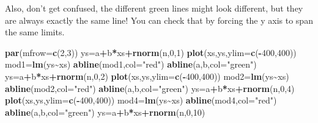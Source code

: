 \documentclass[
]{book}
\newenvironment{Shaded}{\begin{snugshade}}{\end{snugshade}}
\newcommand{\AttributeTok}[1]{\textcolor[rgb]{0.13,0.29,0.53}{#1}}
\newcommand{\DecValTok}[1]{\textcolor[rgb]{0.00,0.00,0.81}{#1}}
\newcommand{\FunctionTok}[1]{\textcolor[rgb]{0.13,0.29,0.53}{\textbf{#1}}}
\newcommand{\NormalTok}[1]{#1}
\newcommand{\OtherTok}[1]{\textcolor[rgb]{0.56,0.35,0.01}{#1}}
\newcommand{\SpecialCharTok}[1]{\textcolor[rgb]{0.81,0.36,0.00}{\textbf{#1}}}
\newcommand{\StringTok}[1]{\textcolor[rgb]{0.31,0.60,0.02}{#1}}
\begin{document}
Also, don't get confused, the different green lines might look different, but they are always exactly the same line! You can check that by forcing the y axis to span the same limits.

\begin{Shaded}
\begin{Highlighting}[]
\FunctionTok{par}\NormalTok{(}\AttributeTok{mfrow=}\FunctionTok{c}\NormalTok{(}\DecValTok{2}\NormalTok{,}\DecValTok{3}\NormalTok{))}
\NormalTok{ys}\OtherTok{=}\NormalTok{a}\SpecialCharTok{+}\NormalTok{b}\SpecialCharTok{*}\NormalTok{xs}\SpecialCharTok{+}\FunctionTok{rnorm}\NormalTok{(n,}\DecValTok{0}\NormalTok{,}\DecValTok{1}\NormalTok{)}
\FunctionTok{plot}\NormalTok{(xs,ys,}\AttributeTok{ylim=}\FunctionTok{c}\NormalTok{(}\SpecialCharTok{{-}}\DecValTok{400}\NormalTok{,}\DecValTok{400}\NormalTok{))}
\NormalTok{mod1}\OtherTok{=}\FunctionTok{lm}\NormalTok{(ys}\SpecialCharTok{\textasciitilde{}}\NormalTok{xs)}
\FunctionTok{abline}\NormalTok{(mod1,}\AttributeTok{col=}\StringTok{"red"}\NormalTok{)}
\FunctionTok{abline}\NormalTok{(a,b,}\AttributeTok{col=}\StringTok{"green"}\NormalTok{)}
\NormalTok{ys}\OtherTok{=}\NormalTok{a}\SpecialCharTok{+}\NormalTok{b}\SpecialCharTok{*}\NormalTok{xs}\SpecialCharTok{+}\FunctionTok{rnorm}\NormalTok{(n,}\DecValTok{0}\NormalTok{,}\DecValTok{2}\NormalTok{)}
\FunctionTok{plot}\NormalTok{(xs,ys,}\AttributeTok{ylim=}\FunctionTok{c}\NormalTok{(}\SpecialCharTok{{-}}\DecValTok{400}\NormalTok{,}\DecValTok{400}\NormalTok{))}
\NormalTok{mod2}\OtherTok{=}\FunctionTok{lm}\NormalTok{(ys}\SpecialCharTok{\textasciitilde{}}\NormalTok{xs)}
\FunctionTok{abline}\NormalTok{(mod2,}\AttributeTok{col=}\StringTok{"red"}\NormalTok{)}
\FunctionTok{abline}\NormalTok{(a,b,}\AttributeTok{col=}\StringTok{"green"}\NormalTok{)}
\NormalTok{ys}\OtherTok{=}\NormalTok{a}\SpecialCharTok{+}\NormalTok{b}\SpecialCharTok{*}\NormalTok{xs}\SpecialCharTok{+}\FunctionTok{rnorm}\NormalTok{(n,}\DecValTok{0}\NormalTok{,}\DecValTok{4}\NormalTok{)}
\FunctionTok{plot}\NormalTok{(xs,ys,}\AttributeTok{ylim=}\FunctionTok{c}\NormalTok{(}\SpecialCharTok{{-}}\DecValTok{400}\NormalTok{,}\DecValTok{400}\NormalTok{))}
\NormalTok{mod4}\OtherTok{=}\FunctionTok{lm}\NormalTok{(ys}\SpecialCharTok{\textasciitilde{}}\NormalTok{xs)}
\FunctionTok{abline}\NormalTok{(mod4,}\AttributeTok{col=}\StringTok{"red"}\NormalTok{)}
\FunctionTok{abline}\NormalTok{(a,b,}\AttributeTok{col=}\StringTok{"green"}\NormalTok{)}
\NormalTok{ys}\OtherTok{=}\NormalTok{a}\SpecialCharTok{+}\NormalTok{b}\SpecialCharTok{*}\NormalTok{xs}\SpecialCharTok{+}\FunctionTok{rnorm}\NormalTok{(n,}\DecValTok{0}\NormalTok{,}\DecValTok{10}\NormalTok{)}

\end{Highlighting}
\end{Shaded}
\end{document}
